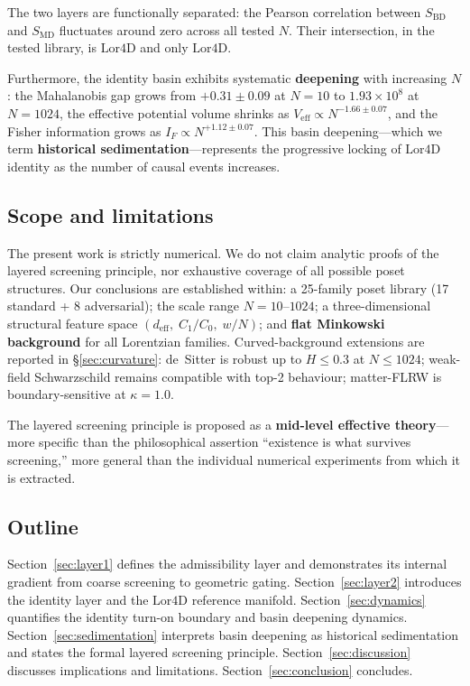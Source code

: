 \documentclass[12pt,a4paper]{article}
\newcommand{\SBD}{S_{\mathrm{BD}}}
\newcommand{\SMD}{S_{\mathrm{MD}}}
\newcommand{\deff}{d_{\mathrm{eff}}}
\newcommand{\Lor}{\mathrm{Lor4D}}
\newcommand{\Veff}{V_{\mathrm{eff}}}
\begin{document}
The two layers are functionally separated: the Pearson correlation between $\SBD$
and $\SMD$ fluctuates around zero across all tested $N$.
Their intersection, in the tested library, is $\Lor$ and only $\Lor$.

Furthermore, the identity basin exhibits systematic \textbf{deepening} with
increasing $N$: the Mahalanobis gap grows from $+0.31\pm 0.09$ at $N=10$ to
$1.93\times 10^8$ at $N=1024$, the effective potential volume shrinks as
$\Veff \propto N^{-1.66\pm 0.07}$, and the Fisher information grows as
$I_F \propto N^{+1.12\pm 0.07}$.
This basin deepening---which we term \textbf{historical sedimentation}---represents
the progressive locking of $\Lor$ identity as the number of causal events increases.


\subsection{Scope and limitations}

The present work is strictly numerical.
We do not claim analytic proofs of the layered screening principle, nor
exhaustive coverage of all possible poset structures.
Our conclusions are established within:
a 25-family poset library (17 standard + 8 adversarial);
the scale range $N=10$--$1024$;
a three-dimensional structural feature space $(\deff,\;C_1/C_0,\;w/N)$;
and \textbf{flat Minkowski background} for all Lorentzian families.
Curved-background extensions are reported in \S\ref{sec:curvature}:
de~Sitter is robust up to $H\leq 0.3$ at $N\leq 1024$;
weak-field Schwarzschild remains compatible with top-2 behaviour;
matter-FLRW is boundary-sensitive at $\kappa=1.0$.

The layered screening principle is proposed as a \textbf{mid-level effective
theory}---more specific than the philosophical assertion ``existence is what
survives screening,'' more general than the individual numerical experiments
from which it is extracted.

\subsection{Outline}

Section~\ref{sec:layer1} defines the admissibility layer and demonstrates its
internal gradient from coarse screening to geometric gating.
Section~\ref{sec:layer2} introduces the identity layer and the $\Lor$ reference
manifold.
Section~\ref{sec:dynamics} quantifies the identity turn-on boundary and basin
deepening dynamics.
Section~\ref{sec:sedimentation} interprets basin deepening as historical
sedimentation and states the formal layered screening principle.
Section~\ref{sec:discussion} discusses implications and limitations.
Section~\ref{sec:conclusion} concludes.
\end{document}

